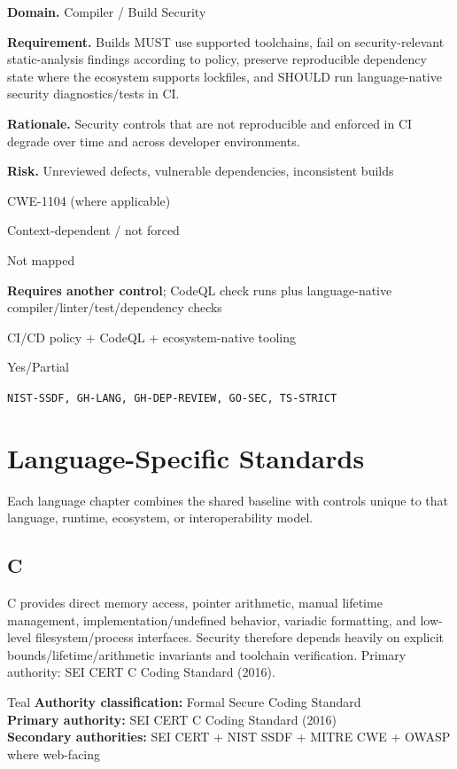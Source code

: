 \documentclass[10pt,letterpaper]{article}
\newcommand{\prioritybadge}[2]{\tcbox[on line,boxrule=0pt,arc=1.2mm,boxsep=0.7mm,left=1mm,right=1mm,top=0.4mm,bottom=0.4mm,colback=#2!12,coltext=#2]{\scriptsize\bfseries #1}}
\begin{document}
\begin{rulebox}[title={\texttt{SCS-ALL-BUILD-001} \hfill \prioritybadge{High Priority}{High}}]
\textbf{Domain.} Compiler / Build Security

\textbf{Requirement.} Builds MUST use supported toolchains, fail on security-relevant static-analysis findings according to policy, preserve reproducible dependency state where the ecosystem supports lockfiles, and SHOULD run language-native security diagnostics/tests in CI.

\textbf{Rationale.} Security controls that are not reproducible and enforced in CI degrade over time and across developer environments.

\textbf{Risk.} Unreviewed defects, vulnerable dependencies, inconsistent builds

\begin{description}[leftmargin=2.65cm,labelwidth=2.3cm,style=nextline,itemsep=1pt,topsep=3pt]
  \item[CWE] CWE-1104 (where applicable)
  \item[OWASP] Context-dependent / not forced
  \item[CERT] Not mapped
  \item[CodeQL] \textbf{Requires another control}; CodeQL check runs plus language-native compiler/linter/test/dependency checks
  \item[Enforcement] CI/CD policy + CodeQL + ecosystem-native tooling
  \item[Automation] Yes/Partial
  \item[Sources] \texttt{NIST-SSDF, GH-LANG, GH-DEP-REVIEW, GO-SEC, TS-STRICT}
\end{description}
\end{rulebox}
\clearpage
\section{Language-Specific Standards}
Each language chapter combines the shared baseline with controls unique to that language, runtime, ecosystem, or interoperability model.
\clearpage
\subsection{C}
C provides direct memory access, pointer arithmetic, manual lifetime management, implementation/undefined behavior, variadic formatting, and low-level filesystem/process interfaces. Security therefore depends heavily on explicit bounds/lifetime/arithmetic invariants and toolchain verification. Primary authority: SEI CERT C Coding Standard (2016).
\begin{callout}{Teal}
\textbf{Authority classification:} Formal Secure Coding Standard\\
\textbf{Primary authority:} SEI CERT C Coding Standard (2016)\\
\textbf{Secondary authorities:} SEI CERT + NIST SSDF + MITRE CWE + OWASP where web-facing
\end{callout}
\end{document}
